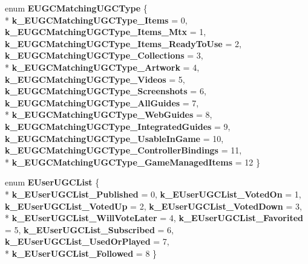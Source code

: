 \begin{DoxyCompactItemize}
\item 
\hypertarget{namespaceValve_1_1Steamworks_a66d832b44ee237501bb601ba562d0f97}{}enum {\bfseries E\+U\+G\+C\+Matching\+U\+G\+C\+Type} \{ \\*
{\bfseries k\+\_\+\+E\+U\+G\+C\+Matching\+U\+G\+C\+Type\+\_\+\+Items} = 0, 
{\bfseries k\+\_\+\+E\+U\+G\+C\+Matching\+U\+G\+C\+Type\+\_\+\+Items\+\_\+\+Mtx} = 1, 
{\bfseries k\+\_\+\+E\+U\+G\+C\+Matching\+U\+G\+C\+Type\+\_\+\+Items\+\_\+\+Ready\+To\+Use} = 2, 
{\bfseries k\+\_\+\+E\+U\+G\+C\+Matching\+U\+G\+C\+Type\+\_\+\+Collections} = 3, 
\\*
{\bfseries k\+\_\+\+E\+U\+G\+C\+Matching\+U\+G\+C\+Type\+\_\+\+Artwork} = 4, 
{\bfseries k\+\_\+\+E\+U\+G\+C\+Matching\+U\+G\+C\+Type\+\_\+\+Videos} = 5, 
{\bfseries k\+\_\+\+E\+U\+G\+C\+Matching\+U\+G\+C\+Type\+\_\+\+Screenshots} = 6, 
{\bfseries k\+\_\+\+E\+U\+G\+C\+Matching\+U\+G\+C\+Type\+\_\+\+All\+Guides} = 7, 
\\*
{\bfseries k\+\_\+\+E\+U\+G\+C\+Matching\+U\+G\+C\+Type\+\_\+\+Web\+Guides} = 8, 
{\bfseries k\+\_\+\+E\+U\+G\+C\+Matching\+U\+G\+C\+Type\+\_\+\+Integrated\+Guides} = 9, 
{\bfseries k\+\_\+\+E\+U\+G\+C\+Matching\+U\+G\+C\+Type\+\_\+\+Usable\+In\+Game} = 10, 
{\bfseries k\+\_\+\+E\+U\+G\+C\+Matching\+U\+G\+C\+Type\+\_\+\+Controller\+Bindings} = 11, 
\\*
{\bfseries k\+\_\+\+E\+U\+G\+C\+Matching\+U\+G\+C\+Type\+\_\+\+Game\+Managed\+Items} = 12
 \}\label{namespaceValve_1_1Steamworks_a66d832b44ee237501bb601ba562d0f97}

\item 
\hypertarget{namespaceValve_1_1Steamworks_af54f5a73c7431c1ed4d4ad44dd4c57bc}{}enum {\bfseries E\+User\+U\+G\+C\+List} \{ \\*
{\bfseries k\+\_\+\+E\+User\+U\+G\+C\+List\+\_\+\+Published} = 0, 
{\bfseries k\+\_\+\+E\+User\+U\+G\+C\+List\+\_\+\+Voted\+On} = 1, 
{\bfseries k\+\_\+\+E\+User\+U\+G\+C\+List\+\_\+\+Voted\+Up} = 2, 
{\bfseries k\+\_\+\+E\+User\+U\+G\+C\+List\+\_\+\+Voted\+Down} = 3, 
\\*
{\bfseries k\+\_\+\+E\+User\+U\+G\+C\+List\+\_\+\+Will\+Vote\+Later} = 4, 
{\bfseries k\+\_\+\+E\+User\+U\+G\+C\+List\+\_\+\+Favorited} = 5, 
{\bfseries k\+\_\+\+E\+User\+U\+G\+C\+List\+\_\+\+Subscribed} = 6, 
{\bfseries k\+\_\+\+E\+User\+U\+G\+C\+List\+\_\+\+Used\+Or\+Played} = 7, 
\\*
{\bfseries k\+\_\+\+E\+User\+U\+G\+C\+List\+\_\+\+Followed} = 8
 \}\label{namespaceValve_1_1Steamworks_af54f5a73c7431c1ed4d4ad44dd4c57bc}


\end{DoxyCompactItemize}
